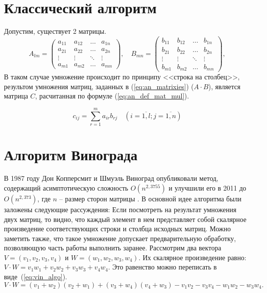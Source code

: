 \section{Классический алгоритм}
Допустим, существует 2 матрицы.
\begin{equation}
	\label{eq:an_matrixies}
	A_{lm} = \begin{pmatrix}
		a_{11} & a_{12} & \ldots & a_{1n}\\
		a_{21} & a_{22} & \ldots & a_{2n}\\
		\vdots & \vdots & \ddots & \vdots\\
		a_{m1} & a_{m2} & \ldots & a_{mn}
	\end{pmatrix},
	\quad
	B_{mn} = \begin{pmatrix}
		b_{11} & b_{12} & \ldots & b_{1n}\\
		b_{21} & b_{22} & \ldots & b_{2n}\\
		\vdots & \vdots & \ddots & \vdots\\
		b_{m1} & b_{m2} & \ldots & b_{mn}
	\end{pmatrix},
\end{equation}
В таком случае умножение происходит по принципу <<строка на столбец>>, результом умножения матриц, заданных в
(\ref{eq:an_matrixies}) ($A \cdot B$), является матрица $C$, расчитанная по формуле (\ref{eq:an_def_mat_mul}).


\begin{equation}
	\label{eq:an_def_mat_mul}
	c_{ij} =
	\sum_{r=1}^{m} a_{ir}b_{rj} \quad (i=\overline{1,l}; j=\overline{1,n})
\end{equation}


\section{Алгоритм Винограда}
В 1987 году Дон Копперсмит и Шмуэль Виноград опубликовали метод, 
содержащий асимптотическую сложность $O(n^{2,3755})$ и улучшили 
его в 2011 до $O(n^{2,373})$, где $n$ -- размер сторон матрицы \cite{book_vinograd}.
В основной идее алгоритма были заложены следующие рассуждения:
Если посмотреть на результат умножения двух матриц, 
то видно, 
что каждый элемент в нем представляет собой 
скалярное произведение соответствующих строки и 
столбца исходных матриц. 
Можно заметить также, что такое умножение допускает предварительную 
обработку, позволяющую часть работы выполнить заранее.
Рассмотрим два вектора $V = (v_1, v_2, v_3, v_4)$ и $W = (w_1, w_2, w_3, w_4)$. Их скалярное произведение равно:
$V \cdot W = v_1w_1 + v_2w_2 + v_3w_3 + v_4w_4$.
Это равенство можно переписать в виде~(\ref{eq:vin_algo}).
\begin{equation}
	\label{eq:vin_algo}
	V \cdot W = (v_1 + w_2)(v_2 + w_1) + (v_3 + w_4)(v_4 + w_3) - v_1v_2 - v_3v_4 - w_1w_2 - w_3w_4.	
\end{equation}

